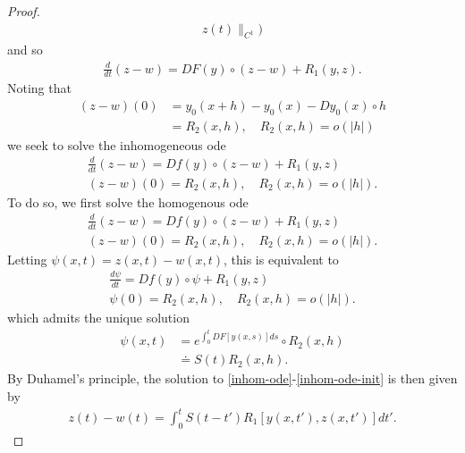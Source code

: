 \documentclass[12pt,reqno]{amsart}
\numberwithin{equation}{section}  %
\numberwithin{figure}{section}
\theoremstyle{plain}
\theoremstyle{definition}
\theoremstyle{remark}
\begin{document}
\begin{proof}
\begin{equation*}
\begin{split}
  z(t) \|_{C^{1}})
\end{split}
\end{equation*}
%
%
and so
%
%
\begin{equation*}
\begin{split}
  \frac{d}{dt}(z-w) = DF(y) \circ (z-w) + R_{1}(y,z).
\end{split}
\end{equation*}
%
%
Noting that %
%
\begin{equation*}
\begin{split}
  (z-w)(0) & = y_{0}(x+h) - y_{0}(x) - Dy_{0}(x) \circ h
  \\
  & = R_{2}(x,h), \quad R_{2}(x,h) = o(| h |)
\end{split}
\end{equation*}
%
%
we seek to solve the inhomogeneous ode
%
%
\begin{gather}
  \frac{d}{dt}(z-w)  = Df(y) \circ (z-w) + R_{1}(y,z)
\label{inhom-ode}
  \\
  (z-w)(0) = R_{2}(x,h), \quad R_{2}(x,h) = o(| h |).
  \label{inhom-ode-init}
\end{gather}
%
%
To do so, we first solve the homogenous ode
\begin{gather}
  \frac{d}{dt}(z-w)  = Df(y) \circ (z-w) + R_{1}(y,z)
\label{hom-ode}
  \\
  (z-w)(0) = R_{2}(x,h), \quad R_{2}(x,h) = o(| h |).
  \label{hom-ode-init}
\end{gather}
Letting $\psi(x,t) = z(x,t) - w(x,t)$, this is equivalent to
%
%
%
\begin{gather*}
  \frac{d\psi}{dt}  = Df(y) \circ \psi + R_{1}(y,z)
  \\
  \psi(0) = R_{2}(x,h), \quad R_{2}(x,h) = o(| h |).
\end{gather*}
which admits the unique solution
%
%
\begin{equation*}
\begin{split}
  \psi(x,t) 
  & = e^{\int_{0}^{t} DF\left[ y(x,s) \right]ds} \circ R_{2}(x,h) 
  \\
  & \doteq S(t)R_{2}(x,h).
\end{split}
\end{equation*}
%
%
By Duhamel's principle, the solution to \eqref{inhom-ode}-\eqref{inhom-ode-init}
is then given by
%
%
\begin{equation*}
\begin{split}
  z(t) - w(t) = \int_{0}^{t} S(t-t') R_{1}\left[ y(x,t'), z(x,t') \right]dt'.
\end{split}
\end{equation*}

\end{proof}
\end{document}
